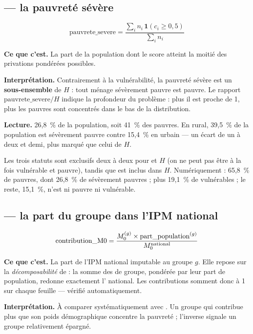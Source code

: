 \documentclass[11pt,a4paper]{article}
\begin{document}
\subsection*{ --- la pauvreté sévère}

\[
\text{pauvrete\_severe} = \frac{\sum_i n_i \, \mathbf{1}(c_i \ge 0{,}5)}{\sum_i n_i}
\]

\textbf{Ce que c'est.} La part de la population dont le score atteint la moitié des privations
pondérées possibles.

\textbf{Interprétation.} Contrairement à la vulnérabilité, la pauvreté sévère est un
\textbf{sous-ensemble} de $H$ : tout ménage sévèrement pauvre est pauvre. Le rapport
$\text{pauvrete\_severe} / H$ indique la profondeur du problème : plus il est proche de 1, plus les
pauvres sont concentrés dans le bas de la distribution.

\textbf{Lecture.} 26,8~\% de la population, soit 41~\% des pauvres. En rural, 39,5~\% de la
population est sévèrement pauvre contre 15,4~\% en urbain --- un écart de un à deux et demi, plus
marqué que celui de $H$.

\begin{retenir}
Les trois statuts sont exclusifs deux à deux pour  et $H$ (on ne peut pas être à
la fois vulnérable et pauvre), tandis que  est inclus dans $H$.
Numériquement : 65,8~\% de pauvres, dont 26,8~\% de sévèrement pauvres ; plus 19,1~\% de
vulnérables ; le reste, 15,1~\%, n'est ni pauvre ni vulnérable.
\end{retenir}

\subsection*{ --- la part du groupe dans l'IPM national}

\[
\text{contribution\_M0} = \frac{M_{0}^{(g)} \times \text{part\_population}^{(g)}}{M_{0}^{\text{national}}}
\]

\textbf{Ce que c'est.} La part de l'IPM national imputable au groupe $g$. Elle repose sur la
\emph{décomposabilité} de \ipm{} : la somme des \ipm{} de groupe, pondérée par leur part de
population, redonne exactement l'\ipm{} national. Les contributions somment donc à 1 sur chaque
feuille --- vérifié automatiquement.

\textbf{Interprétation.} À comparer systématiquement avec . Un groupe qui
contribue plus que son poids démographique concentre la pauvreté ; l'inverse signale un groupe
relativement épargné.
\end{document}
